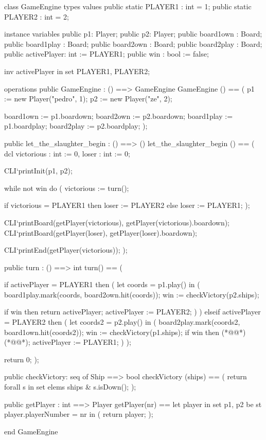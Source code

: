 \begin{vdm_al}
class GameEngine
 types
 values
  public static PLAYER1 : int = 1;
  public static PLAYER2 : int = 2;
  
 instance variables
  public p1: Player;
  public p2: Player;
  public board1own : Board;
  public board1play : Board;
  public board2own : Board;
  public board2play : Board;
  public activePlayer: int := PLAYER1;
  public win : bool := false;
  
  inv activePlayer in set {PLAYER1, PLAYER2};
  
 operations
  public GameEngine : () ==> GameEngine
   GameEngine () ==
   (
    p1 := new Player("pedro", 1);
    p2 := new Player("ze", 2);
    
    board1own := p1.boardown;
    board2own := p2.boardown;
    board1play := p1.boardplay;
    board2play := p2.boardplay;
   );

  public let_the_slaughter_begin : () ==> ()
   let_the_slaughter_begin () ==
   (
    dcl victorious : int := 0, loser : int := 0;
    
    CLI`printInit(p1, p2);
    
    while not win do
    (
     victorious := turn();
     
     if victorious = PLAYER1 then loser := PLAYER2
     else loser := PLAYER1;
    );
    
    CLI`printBoard(getPlayer(victorious), getPlayer(victorious).boardown);
    CLI`printBoard(getPlayer(loser), getPlayer(loser).boardown);
    
    CLI`printEnd(getPlayer(victorious));
   );

  public turn : () ==> int
   turn() == (
   
    if activePlayer = PLAYER1 then (
     let coords = p1.play() in
     (
      board1play.mark(coords, board2own.hit(coords));
      win := checkVictory(p2.ships);
      
      if win then return activePlayer;
      activePlayer := PLAYER2;
     )
    )
    elseif activePlayer = PLAYER2 then (
     let coords2 = p2.play() in
     (
      board2play.mark(coords2, board1own.hit(coords2));
      win := checkVictory(p1.ships);
      if win then (*@@*) (*@@*);
      activePlayer := PLAYER1;
     )
    );
    
    return 0;
   );
  
  public checkVictory: seq of Ship ==> bool
   checkVictory (ships) ==
   (
    return forall s in set elems ships & s.isDown(); 
   );
   
  public getPlayer : int ==> Player
   getPlayer(nr) ==
    let player in set {p1, p2} be st player.playerNumber = nr in (
      return player;
    );


end GameEngine
\end{vdm_al}
